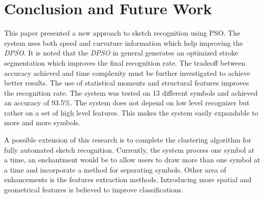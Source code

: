 \documentclass{article}
\begin{document}
\section{Conclusion and Future Work}
\label{ConclusionandFutureWork}
This paper presented a new approach to sketch recognition using PSO. The system uses both speed and curvature information which help improving the \textit{DPSO}. It is noted that the \textit{DPSO} in general generates an optimized stroke segmentation which improves the final recognition rate.  The tradeoff between accuracy achieved and time complexity must be further investigated to achieve better results. The use of statistical moments and structural features improves the recognition rate. The system was tested on 13 different symbols and achieved an accuracy of 93.5\%. The system does not depend on low level recognizer but rather on a set of high level features. This makes the system easily expandable to more and more symbols. 

 A possible extension of this research is to complete the clustering algorithm for fully automated sketch recognition. Currently, the system process one symbol at a time, an enchantment would be to allow users to draw more than one symbol at a time and incorporate a method for separating symbols. Other area of enhancements is the features extraction methods. Introducing more spatial and geometrical features is believed to improve classifications.  


\end{document}
